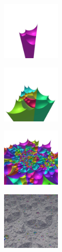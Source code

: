 \documentclass[suppldata, dvipdfmx]{interact}
\theoremstyle{plain}%
\theoremstyle{definition}
\theoremstyle{remark}
\theoremstyle{problemstyle}
\begin{document}
\begin{figure}[h!tbp]
 \begin{minipage}[t]{0.18\textwidth}
  \centering
  \includegraphics[height=1.1in, keepaspectratio]{./img/constructFractal/terrainProcess/step1.jpg}
  \label{fig:terrainStep1}
 \end{minipage}
 \hspace*{\fill}
 \begin{minipage}[t]{0.18\textwidth}
  \centering
  \includegraphics[height=1.1in, keepaspectratio]{./img/constructFractal/terrainProcess/step2.jpg}
  \label{fig:terrainStep2}
 \end{minipage}
 \hspace*{\fill}
 \begin{minipage}[t]{0.18\textwidth}
  \centering
  \includegraphics[height=1.1in, keepaspectratio]{./img/constructFractal/terrainProcess/step5.jpg}
  \label{fig:terrainStep5}
 \end{minipage}
 \hspace*{\fill}
 \begin{minipage}[t]{0.18\textwidth}
  \centering
  \includegraphics[height=1.1in, keepaspectratio]{./img/constructFractal/terrainProcess/step20.jpg}

\end{minipage}
\end{figure}
\end{document}
